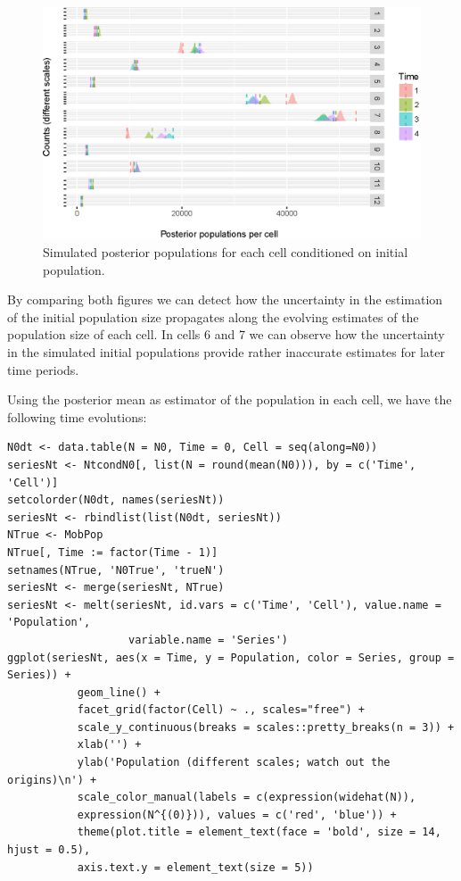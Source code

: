 \documentclass[12pt, a4paper]{article}
\begin{document}
\begin{figure}
	\centering
	\includegraphics[scale=0.85]{time2.eps}
	\caption{Simulated posterior populations for each cell conditioned on initial population.}
	\label{time2} 	
\end{figure}

By comparing both figures we can detect how the uncertainty in the estimation of the initial population 
size propagates along the evolving estimates of the population size of each cell. In cells 6 and 7 we can 
observe how the uncertainty in the simulated initial populations provide rather inaccurate estimates for later time periods. 

Using the posterior mean as estimator of the population in each cell, we have the following time evolutions:

\begin{verbatim}
N0dt <- data.table(N = N0, Time = 0, Cell = seq(along=N0))
seriesNt <- NtcondN0[, list(N = round(mean(N0))), by = c('Time', 'Cell')]
setcolorder(N0dt, names(seriesNt))
seriesNt <- rbindlist(list(N0dt, seriesNt))
NTrue <- MobPop
NTrue[, Time := factor(Time - 1)]
setnames(NTrue, 'N0True', 'trueN')
seriesNt <- merge(seriesNt, NTrue)
seriesNt <- melt(seriesNt, id.vars = c('Time', 'Cell'), value.name = 'Population', 
                   variable.name = 'Series')
ggplot(seriesNt, aes(x = Time, y = Population, color = Series, group = Series)) + 
           geom_line() + 
           facet_grid(factor(Cell) ~ ., scales="free") +
           scale_y_continuous(breaks = scales::pretty_breaks(n = 3)) +
           xlab('') + 
           ylab('Population (different scales; watch out the origins)\n') +
           scale_color_manual(labels = c(expression(widehat(N)), 
           expression(N^{(0)})), values = c('red', 'blue')) +
           theme(plot.title = element_text(face = 'bold', size = 14, hjust = 0.5), 
           axis.text.y = element_text(size = 5))
\end{verbatim}
\end{document}
